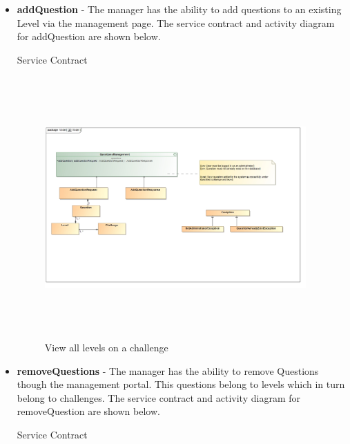 \documentclass[english]{article}
\begin{document}
		
			\begin{itemize}
		  		\item \textbf{addQuestion} -  The manager has the ability to add questions to an existing Level via the management page. The service contract and activity diagram for addQuestion are shown below.
		  		
		  		\begin{center}
		  			Service Contract
		  		\end{center}
		  		
		  		\begin{figure}[H]
		  			\begin{center}
		  				
		  				\includegraphics[width=10cm,height=10cm,keepaspectratio]{addQuestionContract.jpg}
		  			\end{center}
		  			\caption{View all levels on a challenge}
		  			
		  		\end{figure}
		  		
		  
	  		
	  		\item \textbf{removeQuestions} -  The manager has the ability to remove Questions though the management portal. This questions belong to levels which in turn belong to challenges. The service contract and activity diagram for removeQuestion are shown below.
	  		
	  			\begin{center}
	  				Service Contract
	  			\end{center}
	  			
	  			\begin{figure}[H]
	  				\begin{center}
	  				

\end{center}
\end{figure}
\end{itemize}
\end{document}
